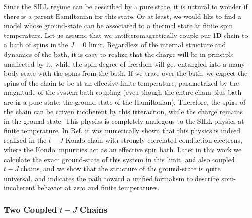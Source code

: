 \documentclass[article,11pt]{revtex4}
\begin{document}
Since the SILL regime can be described by a pure state, it is natural to wonder if there is a parent Hamiltonian for this state. Or at least, we would like to find a model whose ground-state can be associated to a thermal state at finite spin temperature.
Let us assume that we antiferromagnetically couple our 1D chain to a bath of spins in the $J=0$ limit. Regardless of the internal structure and dynamics of the bath, it is easy to realize that the charge will be in principle unaffected by it, while the spin degree of freedom will get entangled into a many-body state with the spins from the bath. If we trace over the bath, we expect the spins of the chain to be at an effective finite temperature, parametrized by the magnitude of the system-bath coupling (even though the entire chain plus bath are in a pure state: the ground state of the Hamiltonian). Therefore, the spins of the chain can be driven incoherent by this interaction, while the charge remains in the ground-state. This physics is completely analogous to the SILL physics at finite temperature. 
In Ref. it was numerically shown that this physics is indeed realized in the $t-J$-Kondo chain with strongly correlated conduction electrons, where the Kondo impurities act as an effective spin bath. Later in this work we calculate the exact ground-state of this system in this limit, and also coupled $t-J$ chains, and we show that the structure of the ground-state is quite universal, and indicates the path toward a unified formalism to describe spin-incoherent behavior at zero and finite temperatures.

\subsubsection {Two Coupled $t-J$ Chains}
\end{document}
